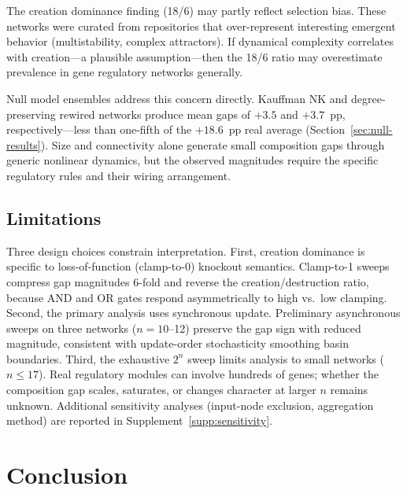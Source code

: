 \documentclass[10pt]{article}
\begin{document}
The creation dominance finding (18/6) may partly reflect selection
bias. These networks were curated from repositories that
over-represent interesting emergent behavior (multistability, complex
attractors). If dynamical complexity correlates with creation---a
plausible assumption---then the 18/6 ratio may overestimate
prevalence in gene regulatory networks generally.

Null model ensembles address this concern directly. Kauffman NK and
degree-preserving rewired networks produce mean gaps of $+3.5$ and
$+3.7$~pp, respectively---less than one-fifth of the $+18.6$~pp
real average (Section~\ref{sec:null-results}). Size and connectivity
alone generate small composition gaps through generic nonlinear
dynamics, but the observed magnitudes require the specific regulatory
rules and their wiring arrangement.

\subsection{Limitations}

Three design choices constrain interpretation.
First, creation dominance is specific to loss-of-function (clamp-to-0)
knockout semantics. Clamp-to-1 sweeps compress gap magnitudes 6-fold
and reverse the creation/destruction ratio, because AND and OR gates
respond asymmetrically to high vs.\ low clamping.
Second, the primary analysis uses synchronous update.
Preliminary asynchronous sweeps on three networks ($n = 10$--12)
preserve the gap sign with reduced magnitude, consistent with
update-order stochasticity smoothing basin boundaries.
Third, the exhaustive $2^n$ sweep limits analysis to small
networks ($n \leq 17$). Real regulatory modules can involve
hundreds of genes; whether the composition gap scales, saturates,
or changes character at larger $n$ remains unknown.
Additional sensitivity analyses (input-node exclusion,
aggregation method) are reported in
Supplement~\ref{supp:sensitivity}.


\section{Conclusion}
\label{sec:conclusion}
\end{document}
